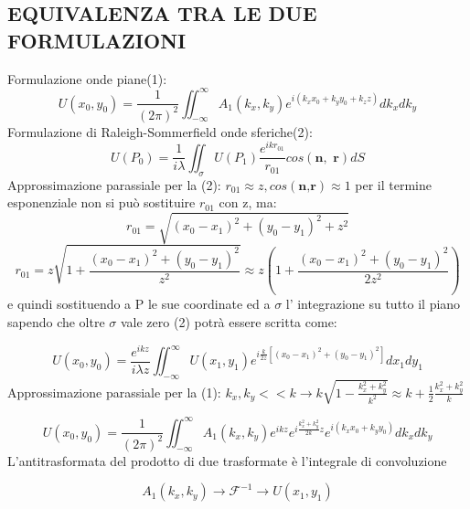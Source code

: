\documentclass{article}
\begin{document}
\subsection{EQUIVALENZA TRA LE DUE FORMULAZIONI}
Formulazione onde piane(1):
\begin{equation}
U(x_{0},y_{0})=\frac{1}{(2\pi)^{2}}\iint_{-\infty}^{\infty} A_{1}(k_{x},k_{y} ) e^{i( k_{x} x_{0} +k_{y} y_{0} +k_{z} z)}dk_{x}dk_{y} 				
\end{equation}
Formulazione di Raleigh-Sommerfield onde sferiche(2):
\begin{equation}
U(P_{0}) = \frac{1}{i\lambda} \iint_\sigma U(P_{1}) \frac{e^{i k r_{01}}}{r_{01}} cos(\textbf{n} , \textbf{ r})dS
\end{equation}
Approssimazione parassiale per la (2):
$ r_{01}\approx z, cos(\textbf{n,r})\approx1 $ per il termine esponenziale non si può sostituire $r_{01}$ con z, ma:
\begin{equation}
r_{01} = \sqrt{(x_{0} - x_{1})^{2} + (y_{0}- y_{1})^{2} + z^{2}}
\end{equation}
\begin{equation}
r_{01}= z \sqrt{1+\frac{(x_{0} - x_{1})^{2} + (y_{0}- y_{1})^{2}}{z^{2}}}\approx z ( 1 + \frac{(x_{0} - x_{1})^{2} + (y_{0}- y_{1})^{2}}{2 z^{2}})
\end{equation}
e quindi sostituendo a P le sue coordinate ed a $\sigma$ l' integrazione su tutto il piano sapendo che oltre $\sigma$ vale zero (2) potrà essere scritta come:

\begin{equation}
U(x_{0}, y_{0})= \frac{e^{i k z}  }{i \lambda z} \iint_{-\infty}^{\infty} U(x_{1}, y_{1}) e^{i\frac{k}{2z} [(x_{0}- x_{1})^{2} + (y_{0}- y_{1})^{2}]}dx_{1}dy_{1}
\end{equation}
Approssimazione parassiale per la (1): $k_{x},k_{y} << k \longrightarrow k \sqrt{1 - \frac{ k_{x} ^{2} + k_{y} ^{2} }{ k^{2} }}\approx k +\frac{1}{2} \frac{k_{x} ^{2} + k_{y} ^{2}}{k}$

\begin{equation}
U(x_{0},y_{0})=\frac{1}{(2\pi)^{2}}\iint_{-\infty}^{\infty} A_{1}(k_{x},k_{y} )  e^{i k z} e^{i \frac{k_{x}^{2}+k_{y}^{2}}{2k} z} e^{i( k_{x} x_{0} +k_{y} y_{0} )} dk_{x}dk_{y} 				
\end{equation}
L'antitrasformata del prodotto di due trasformate è l'integrale di convoluzione

\begin{equation}
A_{1}(k_{x}, k_{y})\longrightarrow{\mathscr{F}^{-1} }\longrightarrow U(x_{1}, y_{1})
\end{equation}
\end{document}
